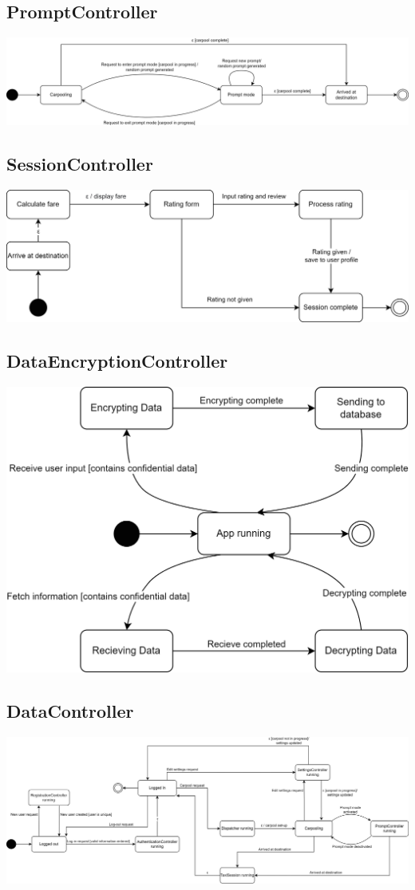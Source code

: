 \documentclass[]{article}
\begin{document}
\subsection*{PromptController}
\includegraphics[scale=0.65]{StateCharts/Prompts.png}

\subsection*{SessionController}
\includegraphics{StateCharts/Session.png}

\subsection*{DataEncryptionController}
\includegraphics{StateCharts/DataEncryption.png}

\subsection*{DataController}
\includegraphics[scale=0.55]{StateCharts/Data.png}
\end{document}

